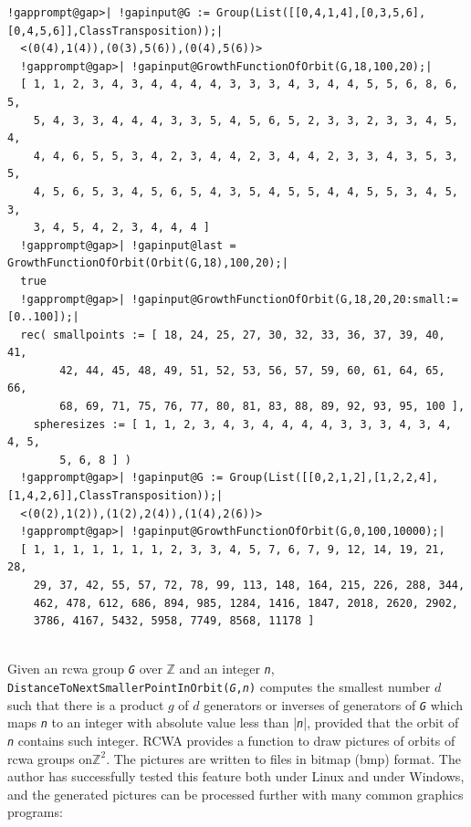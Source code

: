 \documentclass[a4paper,11pt]{report}
\begin{document}
{{{\begin{Verbatim}[commandchars=!@|,fontsize=\small,frame=single,label=Example]
  !gapprompt@gap>| !gapinput@G := Group(List([[0,4,1,4],[0,3,5,6],[0,4,5,6]],ClassTransposition));|
  <(0(4),1(4)),(0(3),5(6)),(0(4),5(6))>
  !gapprompt@gap>| !gapinput@GrowthFunctionOfOrbit(G,18,100,20);|
  [ 1, 1, 2, 3, 4, 3, 4, 4, 4, 4, 3, 3, 3, 4, 3, 4, 4, 5, 5, 6, 8, 6, 5, 
    5, 4, 3, 3, 4, 4, 4, 3, 3, 5, 4, 5, 6, 5, 2, 3, 3, 2, 3, 3, 4, 5, 4, 
    4, 4, 6, 5, 5, 3, 4, 2, 3, 4, 4, 2, 3, 4, 4, 2, 3, 3, 4, 3, 5, 3, 5, 
    4, 5, 6, 5, 3, 4, 5, 6, 5, 4, 3, 5, 4, 5, 5, 4, 4, 5, 5, 3, 4, 5, 3, 
    3, 4, 5, 4, 2, 3, 4, 4, 4 ]
  !gapprompt@gap>| !gapinput@last = GrowthFunctionOfOrbit(Orbit(G,18),100,20);|
  true
  !gapprompt@gap>| !gapinput@GrowthFunctionOfOrbit(G,18,20,20:small:=[0..100]);|
  rec( smallpoints := [ 18, 24, 25, 27, 30, 32, 33, 36, 37, 39, 40, 41, 
        42, 44, 45, 48, 49, 51, 52, 53, 56, 57, 59, 60, 61, 64, 65, 66, 
        68, 69, 71, 75, 76, 77, 80, 81, 83, 88, 89, 92, 93, 95, 100 ], 
    spheresizes := [ 1, 1, 2, 3, 4, 3, 4, 4, 4, 4, 3, 3, 3, 4, 3, 4, 4, 5, 
        5, 6, 8 ] )
  !gapprompt@gap>| !gapinput@G := Group(List([[0,2,1,2],[1,2,2,4],[1,4,2,6]],ClassTransposition));|
  <(0(2),1(2)),(1(2),2(4)),(1(4),2(6))>
  !gapprompt@gap>| !gapinput@GrowthFunctionOfOrbit(G,0,100,10000);|
  [ 1, 1, 1, 1, 1, 1, 1, 2, 3, 3, 4, 5, 7, 6, 7, 9, 12, 14, 19, 21, 28, 
    29, 37, 42, 55, 57, 72, 78, 99, 113, 148, 164, 215, 226, 288, 344, 
    462, 478, 612, 686, 894, 985, 1284, 1416, 1847, 2018, 2620, 2902, 
    3786, 4167, 5432, 5958, 7749, 8568, 11178 ]
  
\end{Verbatim}
 }

  Given an rcwa group \mbox{\texttt{\mdseries\slshape G}} over {\ensuremath{\mathbb Z}} and an integer \mbox{\texttt{\mdseries\slshape n}}, \texttt{DistanceToNextSmallerPointInOrbit(}\mbox{\texttt{\mdseries\slshape G}}\texttt{,}\mbox{\texttt{\mdseries\slshape n}}\texttt{)} computes the smallest number $d$ such that there is a product $g$ of $d$ generators or inverses of generators of \mbox{\texttt{\mdseries\slshape G}} which maps \mbox{\texttt{\mdseries\slshape n}} to an integer with absolute value less than |\mbox{\texttt{\mdseries\slshape n}}|, provided that the orbit of \mbox{\texttt{\mdseries\slshape n}} contains such integer. \textsf{RCWA} provides a function to draw pictures of orbits of rcwa groups
on{\nobreakspace}${\ensuremath{\mathbb Z}}^2$. The pictures are written to files in bitmap\texttt{}
(bmp\texttt{}) format. The author has successfully tested this
feature both under Linux and under Windows, and the generated pictures can be
processed further with many common graphics programs: 

}}
\end{document}
